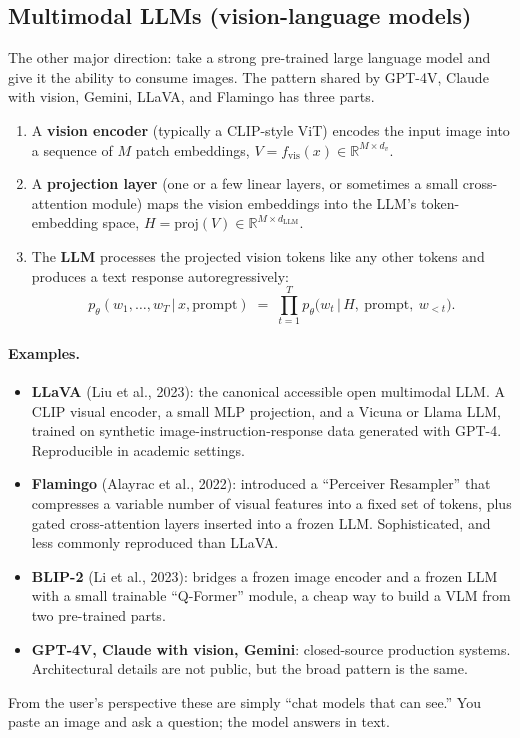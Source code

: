 \documentclass[11pt]{article}
\newcommand{\given}{\,\vert\,}
\newcommand{\R}{\mathbb{R}}
\theoremstyle{remark}
\begin{document}
\subsection{Multimodal LLMs (vision-language models)}
The other major direction: take a strong pre-trained large language model and give it the ability to consume images. The pattern shared by GPT-4V, Claude with vision, Gemini, LLaVA, and Flamingo has three parts.
\begin{enumerate}[leftmargin=1.6em]
  \item A \textbf{vision encoder} (typically a CLIP-style ViT) encodes the input image into a sequence of $M$ patch embeddings, $V = f_{\text{vis}}(x) \in \R^{M \times d_v}$.
  \item A \textbf{projection layer} (one or a few linear layers, or sometimes a small cross-attention module) maps the vision embeddings into the LLM's token-embedding space, $H = \mathrm{proj}(V) \in \R^{M \times d_{\text{LLM}}}$.
  \item The \textbf{LLM} processes the projected vision tokens like any other tokens and produces a text response autoregressively:
  \begin{equation}
  p_\theta(w_1, \dots, w_T \given x, \text{prompt}) \;=\; \prod_{t=1}^{T} p_\theta\big(w_t \given H,\ \text{prompt},\ w_{<t}\big).
  \label{eq:vlm}
  \end{equation}
\end{enumerate}

\paragraph{Examples.}
\begin{itemize}[leftmargin=1.4em]
  \item \textbf{LLaVA} (Liu et al., 2023): the canonical accessible open multimodal LLM. A CLIP visual encoder, a small MLP projection, and a Vicuna or Llama LLM, trained on synthetic image-instruction-response data generated with GPT-4. Reproducible in academic settings.
  \item \textbf{Flamingo} (Alayrac et al., 2022): introduced a ``Perceiver Resampler'' that compresses a variable number of visual features into a fixed set of tokens, plus gated cross-attention layers inserted into a frozen LLM. Sophisticated, and less commonly reproduced than LLaVA.
  \item \textbf{BLIP-2} (Li et al., 2023): bridges a frozen image encoder and a frozen LLM with a small trainable ``Q-Former'' module, a cheap way to build a VLM from two pre-trained parts.
  \item \textbf{GPT-4V, Claude with vision, Gemini}: closed-source production systems. Architectural details are not public, but the broad pattern is the same.
\end{itemize}
From the user's perspective these are simply ``chat models that can see.'' You paste an image and ask a question; the model answers in text.
\end{document}
